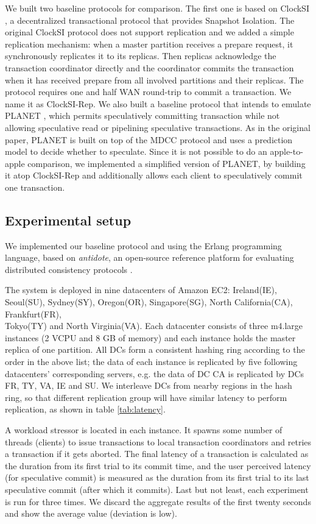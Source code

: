 We built two baseline protocols for comparison. The first one is based on ClockSI \cite{clocksi}, a decentralized transactional protocol that provides Snapshot Isolation. The original ClockSI protocol does not support replication and we added a simple replication mechanism: when a master partition receives a prepare request, it synchronously replicates it to its replicas. Then replicas  acknowledge the transaction coordinator directly and the coordinator commits the transaction when it has received prepare from all involved partitions and their replicas. The protocol requires one and half WAN round-trip to commit a transaction. We name it as ClockSI-Rep. We also built a baseline protocol that intends to emulate PLANET \cite{pang2014planet}, which permits speculatively committing transaction while not allowing speculative read or pipelining speculative transactions. As in the original paper, PLANET is built on top of the MDCC protocol \cite{kraska2013mdcc} and uses a prediction model to decide whether to speculate. Since it is not possible to do an apple-to-apple comparison, we implemented a simplified version of PLANET, by building it atop ClockSI-Rep and additionally allows each client to speculatively commit one transaction. 

\subsection{Experimental setup}
\label{subsec:setup}
We implemented our baseline protocol and \specula using the Erlang programming language, based on \textit{antidote}, an open-source reference platform for evaluating distributed consistency protocols \cite{antidote}.

The system is deployed in nine datacenters of Amazon EC2: Ireland(IE), Seoul(SU), Sydney(SY), Oregon(OR), Singapore(SG), North California(CA), Frankfurt(FR), \\ Tokyo(TY) and North Virginia(VA). Each datacenter consists of three m4.large instances (2 VCPU and 8 GB of memory) and each instance holds the master replica of one partition. All DCs form a consistent hashing ring according to the order in the above list; the data of each instance is replicated by five following datacenters' corresponding servers, e.g. the data of DC CA is replicated by DCs FR, TY, VA, IE and SU. We interleave DCs from nearby regions in the hash ring, so that different replication group will have similar latency to perform replication, as shown in table \ref{tab:latency}.

A workload stressor is located in each instance. It spawns some number of threads (clients) to issue transactions to local transaction coordinators and retries a transaction if it gets aborted. The final latency of a transaction is calculated as the duration from its first trial to its commit time, and the user perceived latency (for speculative commit) is measured as the duration from its first trial to its last speculative commit (after which it commits). Last but not least, each experiment is run for three times. We discard the aggregate results of the first twenty seconds and show the average value (deviation is low).

